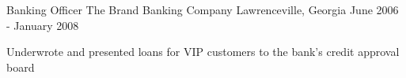 \begin{cventries}
  \cventry
    {Banking Officer} %
    {The Brand Banking Company} %
    {Lawrenceville, Georgia} %
    {June 2006 - January 2008} %
    {\begin{cvitems} %
      \item {Underwrote and presented loans for VIP customers to the bank's credit approval board}
    \end{cvitems}}

\end{cventries}
